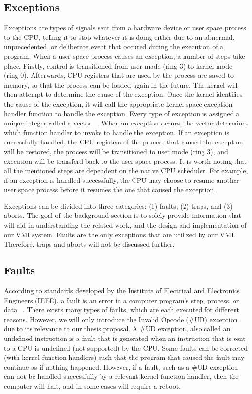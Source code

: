 \documentclass{report}
\begin{document}
\begin{spacing}{1.5}
\subsection{Exceptions}
{\large
Exceptions are types of signals sent from a hardware device or user space process to the CPU, telling it to stop whatever it is doing either due to an abnormal, unprecedented, or deliberate event that occured during the execution of a program. When a user space process causes an exception, a number of steps take place. Firstly, control is transitioned from user mode (ring 3) to kernel mode (ring 0). Afterwards, CPU registers that are used by the process are saved to memory, so that the process can be loaded again in the future. The kernel will then attempt to determine the cause of the exception. Once the kernel identifies the cause of the exception, it will call the appropriate kernel space exception handler function to handle the exception. Every type of exception is assigned a unique integer called a vector ~\cite{mitOperatingSystemEngineering}. When an exception occurs, the vector determines which function handler to invoke to handle the exception. If an exception is successfully handled, the CPU registers of the process that caused the exception will be restored, the process will be transitioned to user mode (ring 3), and execution will be transferd back to the user space process. It is worth noting that all the mentioned steps are dependent on the native CPU scheduler. For example, if an exception is handled successfully, the CPU may choose to resume another user space process before it resumes the one that caused the exception.
\newline
}

{\large
\noindent Exceptions can be divided into three categories: (1) faults, (2) traps, and (3) aborts. The goal of the background section is to solely provide information that will aid in understanding the related work, and the design and implementation of our VMI system. Faults are the only exceptions that are utilized by our VMI. Therefore, traps and aborts will not be discussed further.  
}

\subsection{Faults}
{\large
According to standards developed by the Institute of Electrical and Electronics Engineers (IEEE), a fault is an error in a computer program's step, process, or data ~\cite{diallo2017fault}. There exists many types of faults, which are each executed for different reasons. However, we will only introduce the Invalid Opcode (\#UD) exception due to its relevance to our thesis proposal. A \#UD exception, also called an undefined instruction is a fault that is generated when an instruction that is sent to a CPU is undefined (not supported) by the CPU. Some faults can be corrected (with kernel function handlers) such that the program that caused the fault may continue as if nothing happened. However, if a fault, such as a \#UD exception can not be handled successfully by a relevant kernel function handler, then the computer will halt, and in some cases will require a reboot.
\newline
}



\end{spacing}
\end{document}
